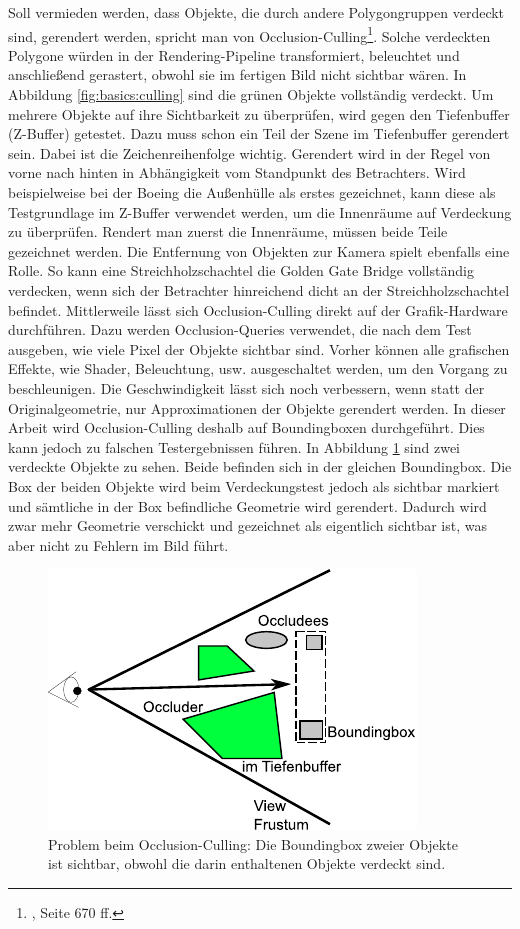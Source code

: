 Soll vermieden werden, dass Objekte, die durch andere Polygongruppen verdeckt sind, gerendert werden, spricht man von Occlusion-Culling\footnote{\cite{RTR3}, Seite 670 ff.}. Solche verdeckten Polygone würden in der Rendering-Pipeline transformiert, beleuchtet und anschließend gerastert, obwohl sie im fertigen Bild nicht sichtbar wären. In Abbildung \ref{fig:basics:culling} sind die grünen Objekte vollständig verdeckt. Um mehrere Objekte auf ihre Sichtbarkeit zu überprüfen, wird gegen den Tiefenbuffer (Z-Buffer) getestet. Dazu muss schon ein Teil der Szene im Tiefenbuffer gerendert sein. Dabei ist die Zeichenreihenfolge wichtig. Gerendert wird in der Regel von vorne nach hinten in Abhängigkeit vom Standpunkt des Betrachters. Wird beispielweise bei der Boeing die Außenhülle als erstes gezeichnet, kann diese als Testgrundlage im Z-Buffer verwendet werden, um die Innenräume auf Verdeckung zu überprüfen. Rendert man zuerst die Innenräume, müssen beide Teile gezeichnet werden. Die Entfernung von Objekten zur Kamera spielt ebenfalls eine Rolle. So kann eine Streichholzschachtel die Golden Gate Bridge vollständig verdecken, wenn sich der Betrachter hinreichend dicht an der Streichholzschachtel befindet. Mittlerweile lässt sich Occlusion-Culling direkt auf der Grafik-Hardware durchführen. Dazu werden Occlusion-Queries verwendet, die nach dem Test ausgeben, wie viele Pixel der Objekte sichtbar sind. Vorher können alle grafischen Effekte, wie Shader, Beleuchtung, usw. ausgeschaltet werden, um den Vorgang zu beschleunigen. Die Geschwindigkeit lässt sich noch verbessern, wenn statt der Originalgeometrie, nur Approximationen der Objekte gerendert werden. In dieser Arbeit wird Occlusion-Culling deshalb auf Boundingboxen durchgeführt. Dies kann jedoch zu falschen Testergebnissen führen. In Abbildung \ref{fig:basics:oculling} sind zwei verdeckte Objekte zu sehen. Beide befinden sich in der gleichen Boundingbox. Die Box der beiden Objekte wird beim Verdeckungstest jedoch als sichtbar markiert und sämtliche in der Box befindliche Geometrie wird gerendert. Dadurch wird zwar mehr Geometrie verschickt und gezeichnet als eigentlich sichtbar ist, was aber nicht zu Fehlern im Bild führt.
\begin{figure}
  \centering
  \includegraphics[scale=0.8]{images/oculling.pdf}
  \caption{\label{fig:basics:oculling}Problem beim Occlusion-Culling: Die Boundingbox zweier Objekte ist sichtbar, obwohl die darin enthaltenen Objekte verdeckt sind.}
  
\end{figure}

